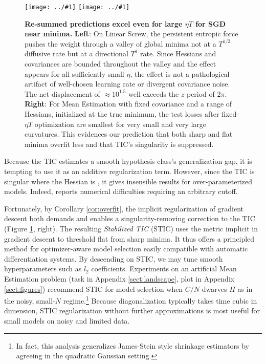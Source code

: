 \documentclass{article}
\theoremstyle{plain}
\theoremstyle{definition}
\newcommand{\plotmoow}[3]{\texttt{[image: ../\#1]}}
\begin{document}
        \begin{figure}[h!] 
            \centering
            \plotmoow{plots/new-thermo-linear-screw}{0.48\columnwidth}{4.0cm}
            \plotmoow{plots/new-tak}{0.48\columnwidth}{4.0cm}
            \caption{
                {\bf Re-summed predictions excel even for large $\eta T$ for
                SGD near minima.}
                {\bf Left}: On Linear Screw, the persistent entropic force
                pushes the weight through a valley of global minima not at a
                $T^{1/2}$ diffusive rate but at a directional $T^1$ rate.
                Since Hessians and covariances are bounded throughout
                the valley and the effect appears for all sufficiently small
                $\eta$, the effect is not a pathological artifact of
                well-chosen learning rate or divergent covariance noise.  The
                net displacement of $\approx 10^{1.5}$ well exceeds the
                $z$-period of $2\pi$. 
                {\bf Right}: For Mean Estimation with fixed covariance and a
                range of Hessians, initialized at the true minimum, the test
                losses after fixed-$\eta T$ optimization are smallest for very
                small and very large curvatures.  This evidences our prediction
                that both sharp and flat minima overfit less and that TIC's
                singularity is suppressed.
            }
            \label{fig:thermoandtak}
        \end{figure}

        Because the TIC estimates a smooth hypothesis class's generalization
        gap, it is tempting to use it as an additive regularization term.
        However, since the TIC is singular where the Hessian is , it gives
        insensible results for over-parameterized models.  Indeed, \citet{di18}
        reports numerical difficulties requiring an arbitrary cutoff. 

        Fortunately, by Corollary \ref{cor:overfit}, the implicit
        regularization of gradient descent both demands and enables a
        singularity-removing correction to the TIC (Figure
        \ref{fig:thermoandtak}, right).  The resulting \emph{Stabilized TIC}
        (STIC) uses the metric implicit in gradient descent to threshold flat
        from sharp minima.  It thus offers a principled method for
        optimizer-aware model selection easily compatible with automatic
        differentiation systems.  By descending on STIC, we may tune smooth
        hyperparameters such as $l_2$ coefficients.  Experiments on an
        artificial Mean Estimation problem (task in Appendix
        \ref{sect:landscape}, plot in Appendix \ref{sect:figures}) recommend
        STIC for model selection when $C/N$ dwarves $H$ as in the
        noisy, small-$N$ regime.\footnote{In fact, this analysis generalizes
        James-Stein style shrinkage estimators by agreeing in the quadratic
        Gaussian setting.} Because diagonalization typically takes time
        cubic in dimension, STIC regularization without further approximations
        is most useful for small models on noisy and limited data.
\end{document}
